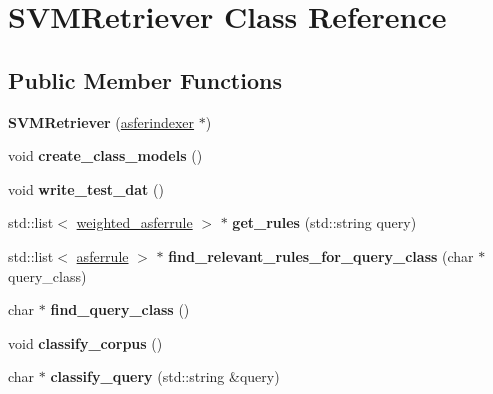 \hypertarget{classSVMRetriever}{\section{S\-V\-M\-Retriever Class Reference}
\label{classSVMRetriever}
}
\subsection*{Public Member Functions}
\begin{DoxyCompactItemize}
\item 
\hypertarget{classSVMRetriever_a45b147ea37705034d7bce412ce6c3480}{{\bfseries S\-V\-M\-Retriever} (\hyperlink{classasferindexer}{asferindexer} $\ast$)}\label{classSVMRetriever_a45b147ea37705034d7bce412ce6c3480}

\item 
\hypertarget{classSVMRetriever_ae5fe0250e6c7b8403b14d32ff80bcd33}{void {\bfseries create\-\_\-class\-\_\-models} ()}\label{classSVMRetriever_ae5fe0250e6c7b8403b14d32ff80bcd33}

\item 
\hypertarget{classSVMRetriever_afa220997ac52076ee74d1d43738a3065}{void {\bfseries write\-\_\-test\-\_\-dat} ()}\label{classSVMRetriever_afa220997ac52076ee74d1d43738a3065}

\item 
\hypertarget{classSVMRetriever_a477022f6a78fcee574058267d0635065}{std\-::list$<$ \hyperlink{structweighted__asferrule}{weighted\-\_\-asferrule} $>$ $\ast$ {\bfseries get\-\_\-rules} (std\-::string query)}\label{classSVMRetriever_a477022f6a78fcee574058267d0635065}

\item 
\hypertarget{classSVMRetriever_a4125aee78c04e0ec12de6a7da0c1e7dd}{std\-::list$<$ \hyperlink{classasferrule}{asferrule} $>$ $\ast$ {\bfseries find\-\_\-relevant\-\_\-rules\-\_\-for\-\_\-query\-\_\-class} (char $\ast$query\-\_\-class)}\label{classSVMRetriever_a4125aee78c04e0ec12de6a7da0c1e7dd}

\item 
\hypertarget{classSVMRetriever_a0b07b2e67daecc919f59682e8fe61609}{char $\ast$ {\bfseries find\-\_\-query\-\_\-class} ()}\label{classSVMRetriever_a0b07b2e67daecc919f59682e8fe61609}

\item 
\hypertarget{classSVMRetriever_ab83e336ceb0ec5a0c784b67178eccc84}{void {\bfseries classify\-\_\-corpus} ()}\label{classSVMRetriever_ab83e336ceb0ec5a0c784b67178eccc84}

\item 
\hypertarget{classSVMRetriever_aa335b10d03a46fd1813aadb407a3bbae}{char $\ast$ {\bfseries classify\-\_\-query} (std\-::string \&query)}\label{classSVMRetriever_aa335b10d03a46fd1813aadb407a3bbae}

\end{DoxyCompactItemize}


